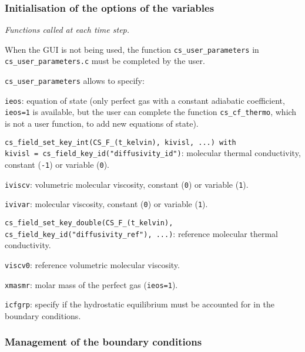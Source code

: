 \subsubsection{ Initialisation of the options of the variables}
\label{prg_uscfx12}%
\noindent
\textit{Functions called at each time step.}

When the GUI is not being used, the function \texttt{cs\_user\_parameters} in \texttt{cs\_user\_parameters.c}
must be completed by the user.

\texttt{cs\_user\_parameters} allows to specify:
\begin{list}{-}{}
\item \texttt{ieos}: equation of state (only perfect gas with a constant adiabatic coefficient,
                      \texttt{ieos=1} is available, but the user can complete the function
                      \texttt{cs\_cf\_thermo}, which is not a user function, to add new equations of state).
\item \texttt{cs\_field\_set\_key\_int(CS\_F\_(t\_kelvin), kivisl, ...) with \\ kivisl = cs\_field\_key\_id("diffusivity\_id")}: molecular thermal conductivity, constant (\texttt{-1}) or variable (\texttt{0}).
\item  \texttt{iviscv}: volumetric molecular viscosity, constant (\texttt{0}) or variable (\texttt{1}).

\item \texttt{ivivar}: molecular viscosity, constant (\texttt{0}) or variable (\texttt{1}).
\item \texttt{cs\_field\_set\_key\_double(CS\_F\_(t\_kelvin),  cs\_field\_key\_id("diffusivity\_ref"), ...)}: reference molecular thermal conductivity.
\item \texttt{viscv0}: reference volumetric molecular viscosity.
\item \texttt{xmasmr}: molar mass of the perfect gas (\texttt{ieos=1}).
\item \texttt{icfgrp}: specify if the hydrostatic equilibrium must be accounted for in the
                       boundary conditions.
\end{list}

\subsubsection{Management of the boundary conditions}

